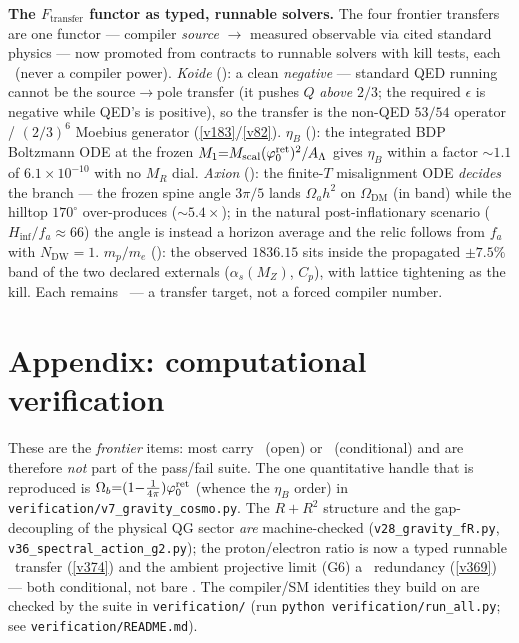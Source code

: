 \par\smallskip\noindent\textbf{The $F_{\mathrm{transfer}}$ functor as typed, runnable solvers.} The four
frontier transfers are one functor --- compiler \emph{source} $\to$ measured observable via cited standard
physics --- now promoted from contracts to runnable solvers with kill tests, each \mC\ (never a compiler
power). \emph{Koide} (): a clean \emph{negative} --- standard QED running cannot
be the source$\to$pole transfer (it pushes $Q$ \emph{above} $2/3$; the required $\epsilon$ is negative while
QED's is positive), so the transfer is the non-QED $53/54$ operator / $(2/3)^6$ Moebius generator
(\vref{v183}/\vref{v82}). \emph{$\eta_B$} (): the integrated BDP Boltzmann
ODE at the frozen $M_1{=}M_{\mathrm{scal}}(\varphi_0^{\mathrm{ret}})^2/A_\Lambda$ gives $\eta_B$ within a factor ${\sim}1.1$ of
$6.1{\times}10^{-10}$ with no $M_R$ dial. \emph{Axion} (): the finite-$T$
misalignment ODE \emph{decides} the branch --- the frozen spine angle $3\pi/5$ lands $\Omega_a h^2$ on
$\Omega_{\mathrm{DM}}$ (in band) while the hilltop $170^\circ$ over-produces (${\sim}5.4\times$); in the
natural post-inflationary scenario ($H_{\mathrm{inf}}/f_a{\approx}66$) the angle is instead a horizon
average and the relic follows from $f_a$ with $N_{\mathrm{DW}}{=}1$.
\emph{$m_p/m_e$} (): the observed $1836.15$ sits inside the propagated
${\pm}7.5\%$ band of the two declared externals ($\alpha_s(M_Z)$, $C_p$), with lattice tightening as the kill.
Each remains \mC\ --- a transfer target, not a forced compiler number.



\section*{Appendix: computational verification}
These are the \emph{frontier} items: most carry \mO\ (open) or \mC\ (conditional) and are therefore
\emph{not} part of the pass/fail suite. The one quantitative handle that is reproduced is
$\Omega_b{=}(1{-}\tfrac1{4\pi})\varphi_0^{\mathrm{ret}}$ (whence the $\eta_B$ order) in
\texttt{verification/v7\_gravity\_cosmo.py}. The $R+R^2$ structure and the gap-decoupling of the physical
QG sector \emph{are} machine-checked (\texttt{v28\_gravity\_fR.py}, \texttt{v36\_spectral\_action\_g2.py}); the
proton/electron ratio is now a typed runnable \mC\ transfer (\vref{v374}) and the ambient projective limit (G6) a
\mC\ redundancy (\vref{v369}) --- both conditional, not bare \mO. The compiler/SM
identities they build on are checked by the suite in \texttt{verification/} (run
\texttt{python verification/run\_all.py}; see \texttt{verification/README.md}).




